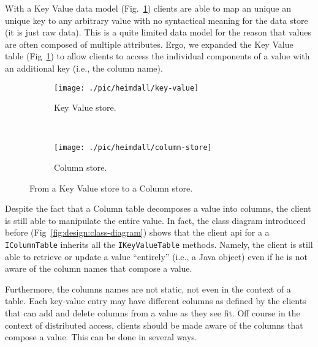 With a Key Value data model (Fig.~\ref{fig:heimdall:columns-0}) clients are able to map an unique an unique key to any arbitrary value with no syntactical meaning for the data store (it is just raw data). 
This is a quite limited data model for the reason that values are often composed of multiple attributes. 
Ergo, we expanded the Key Value table (Fig~\ref{fig:heimdall:columns-0}) to allow clients to access the individual components of a value with an additional key (i.e., the column name). 

\begin{figure}[ht]
  \centering
  \begin{subfigure}[b]{0.5\textwidth}
                \centering
                \texttt{[image: ./pic/heimdall/key-value]}
                \caption{Key Value store.} 
                \label{fig:heimdall:columns-0}

        \end{subfigure}%
        ~
        \begin{subfigure}[b]{0.5\textwidth}
                \centering
                \texttt{[image: ./pic/heimdall/column-store]}
                \caption{Column store.}
                \label{fig:heimdall:columns-1}
        \end{subfigure}
  \caption{From a Key Value store to a Column store. }
  \label{fig:heimdall:columns} 
\end{figure}

Despite the fact that a Column table decomposes a value into columns, the client is still able to manipulate the entire value.
In fact, the class diagram introduced before (Fig~\ref{fig:design:class-diagram}) shows that the client \gls{api} for a a \texttt{IColumnTable} inherits all the \texttt{IKeyValueTable} methods. 
Namely, the client is still able to retrieve or update a value  ``entirely'' (i.e., a Java object) even if he is not aware of  the column names that compose a value. 

Furthermore, the columns names are not static, not even in the context of  a table. Each key-value entry may have different columns as defined by the clients that can add and delete columns from a value as they see fit. 
Off course in the context of distributed access, clients should be made aware of the columns that compose a value. 
This can be done in several ways. 

